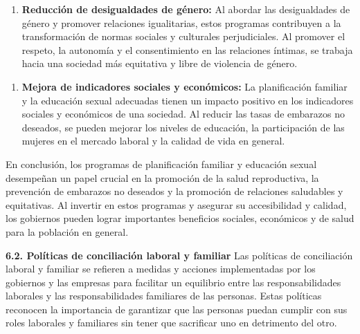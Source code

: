 \documentclass[8pt,a4paper]{beamer}
\begin{document}
{\begin{frame}{}
\begin{block}{}
\begin{enumerate}
\item[\ding{99}] \textbf{Reducción de desigualdades de género:} Al abordar las desigualdades de género y promover relaciones igualitarias, estos programas contribuyen a la transformación de normas sociales y culturales perjudiciales. Al promover el respeto, la autonomía y el consentimiento en las relaciones íntimas, se trabaja hacia una sociedad más equitativa y libre de violencia de género.
\end{enumerate}
\end{block}
\end{frame}

\begin{frame}{}
\begin{block}{}
\setlength{\parskip}{3px}
\justifying

\begin{enumerate}
\setlength{\parskip}{3px}
\justifying
\item[\ding{99}] \textbf{Mejora de indicadores sociales y económicos:} La planificación familiar y la educación sexual adecuadas tienen un impacto positivo en los indicadores sociales y económicos de una sociedad. Al reducir las tasas de embarazos no deseados, se pueden mejorar los niveles de educación, la participación de las mujeres en el mercado laboral y la calidad de vida en general.
\end{enumerate}
En conclusión, los programas de planificación familiar y educación sexual desempeñan un papel crucial en la promoción de la salud reproductiva, la prevención de embarazos no deseados y la promoción de relaciones saludables y equitativas. Al invertir en estos programas y asegurar su accesibilidad y calidad, los gobiernos pueden lograr importantes beneficios sociales, económicos y de salud para la población en general.
\end{block}
\end{frame}

\begin{frame}{}
\begin{block}{\textbf{6.2. Políticas de conciliación laboral y familiar}}
\setlength{\parskip}{3px}
\justifying
Las políticas de conciliación laboral y familiar se refieren a medidas y acciones implementadas por los gobiernos y las empresas para facilitar un equilibrio entre las responsabilidades laborales y las responsabilidades familiares de las personas. Estas políticas reconocen la importancia de garantizar que las personas puedan cumplir con sus roles laborales y familiares sin tener que sacrificar uno en detrimento del otro.


\end{block}
\end{frame}}
\end{document}
